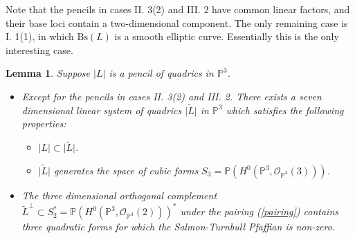\documentclass{amsart}[12pt]
\newtheorem{lemma}[theorem]{Lemma}
\theoremstyle{definition}
\theoremstyle{remark}
\numberwithin{equation}{section}
\newcommand{\abs}[1]{\lvert#1\rvert}
\begin{document}
Note that the pencils in cases II. 3(2) and III. 2 have common linear factors, and their base loci contain a two-dimensional component. The only remaining case is I. 1(1), in which $\mathrm{Bs}(L)$ is a smooth elliptic curve. Essentially this is the only interesting case. 

\begin{lemma}\label{seven}
Suppose $\abs{L}$ is a pencil of quadrics in $\mathbb{P}^3$.
\begin{itemize}
\item[(1)] Except for the pencils in cases II. 3(2) and III. 2. There exists a seven dimensional linear system of quadrics $\abs{\tilde{L}}$ in $\mathbb{P}^3$ which satisfies the following properties:
\begin{itemize}
\item[(a)] $\abs{L} \subset \abs{\tilde{L}}$.
\item[(b)] $\abs{\tilde{L}}$ generates the space of cubic forms $S_3 = \mathbb{P}(H^0(\mathbb{P}^3, \mathcal{O}_{\mathbb{P}^3}(3)))$.
\end{itemize}
\item[(2)] The three dimensional orthogonal complement $\tilde{L}^{\perp} \subset S_2^* = \mathbb{P}(H^0(\mathbb{P}^3, \mathcal{O}_{\mathbb{P}^3}(2)))^*$ under the pairing (\ref{pairing}) contains three quadratic forms for which the Salmon-Turnbull Pfaffian is non-zero. 
\end{itemize}
\end{lemma}
\end{document}
